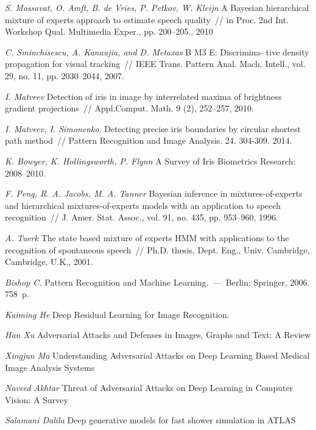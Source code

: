 \documentclass[12pt, twoside]{article}
\numberwithin{equation}{section}
\begin{document}
\begin{thebibliography}{99}
	\textit{S. Mossavat, O. Amft, B. de Vries, P. Petkov, W. Kleijn} A Bayesian hierarchical mixture of experts approach to estimate speech quality~// in Proc. 2nd Int. Workshop Qual. Multimedia Exper., pp. 200--205., 2010
	
	\textit{C. Sminchisescu, A. Kanaujia, and D. Metaxas} B M3 E: Discrimina- tive density propagation for visual tracking~// IEEE Trans. Pattern Anal. Mach. Intell., vol. 29, no. 11, pp. 2030–2044, 2007.
	
	\textit{I. Matveev} Detection of iris in image by interrelated maxima of brightness gradient projections~// Appl.Comput. Math. 9 (2), 252–257, 2010.

	\textit{I. Matveev, I. Simonenko}. Detecting precise iris boundaries by circular shortest path method~// Pattern Recognition and Image Analysis. 24. 304-309. 2014.
	
	\textit{K. Bowyer, K. Hollingsworth, P. Flynn} A Survey of Iris Biometrics Research: 2008–2010.

	\textit{F. Peng, R. A. Jacobs, M. A. Tanner} Bayesian inference in mixtures-of-experts and hierarchical mixtures-of-experts models with an application to speech recognition~// J. Amer. Stat. Assoc., vol. 91, no. 435, pp. 953–960, 1996.
	
	\textit{A. Tuerk} The state based mixture of experts HMM with applications to the recognition of spontaneous speech~// Ph.D. thesis, Dept. Eng., Univ. Cambridge, Cambridge, U.K., 2001.
	
	\textit{Bishop C.} Pattern Recognition and Machine Learning.~---~Berlin: Springer, 2006. 758~p.

	\textit{Kaiming He} Deep Residual Learning for Image Recognition.
	
	\textit{Han Xu} Adversarial Attacks and Defenses in Images, Graphs and Text: A Review
	
	\textit{Xingjun Ma} Understanding Adversarial Attacks on Deep Learning Based Medical Image Analysis Systems
	
	\textit{Naveed Akhtar} Threat of Adversarial Attacks on Deep Learning in Computer Vision: A Survey
	
	\textit{Salamani Dalila} Deep generative models for fast shower simulation in ATLAS
	
 \end{thebibliography}
\end{document}
